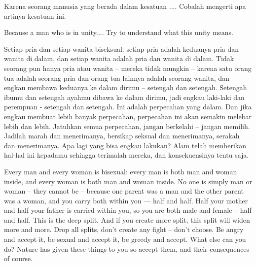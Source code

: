\bahasa
Karena seorang manusia yang berada dalam kesatuan .... Cobalah mengerti apa artinya kesatuan ini.

\english
Because a man who is in unity.... Try to understand what this unity means.

\bahasa
Setiap pria dan setiap wanita biseksual: setiap pria adalah keduanya pria dan wanita di dalam, dan setiap wanita adalah pria dan wanita di dalam. Tidak seorang pun hanya pria atau wanita -- mereka tidak mungkin -- karena satu orang tua adalah seorang pria dan orang tua lainnya adalah seorang wanita, dan engkau membawa keduanya ke dalam dirimu -- setengah dan setengah. Setengah ibumu dan setengah ayahmu dibawa ke dalam dirimu, jadi engkau laki-laki dan perempuan - setengah dan setengah. Ini adalah perpecahan yang dalam. Dan jika engkau membuat lebih banyak perpecahan, perpecahan ini akan semakin melebar lebih dan lebih. Jatuhkan semua perpecahan, jangan berkelahi -- jangan memilih. Jadilah marah dan menerimanya, bersikap seksual dan menerimanya, serakah dan menerimanya. Apa lagi yang bisa engkau lakukan? Alam telah memberikan hal-hal ini kepadamu sehingga terimalah mereka, dan konsekuensinya tentu saja.

\english
Every man and every woman is bisexual: every man is both man and woman inside, and every woman is both man and woman inside. No one is simply man or woman -- they cannot be -- because one parent was a man and the other parent was a woman, and you carry both within you --- half and half. Half your mother and half your father is carried within you, so you are both male and female -- half and half. This is the deep split. And if you create more split, this split will widen more and more. Drop all splits, don't create any fight -- don't choose. Be angry and accept it, be sexual and accept it, be greedy and accept. What else can you do? Nature has given these things to you so accept them, and their consequences of course.




